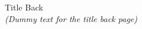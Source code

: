 \thispagestyle{empty}
\begin{center}
    {\Huge Title Back}\\[2em]
    \textit{(Dummy text for the title back page)}
\end{center}
\cleardoublepage